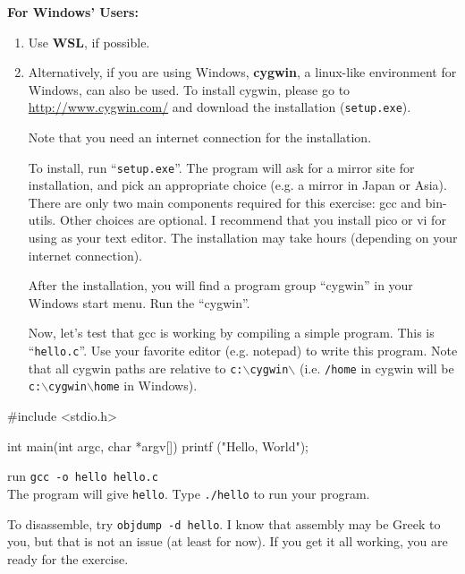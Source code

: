 \documentclass[a4paper, 10pt]{article}
\begin{document}
\noindent \textbf{For Windows' Users:}
\begin{enumerate}
	\item Use \textbf{WSL}, if possible.
	\item Alternatively, if you are using Windows, \textbf{cygwin}, a linux-like environment for Windows, can also be used.
				To install cygwin, please go to \url{http://www.cygwin.com/} and download the installation (\texttt{setup.exe}).

				\myspace

				Note that you need an internet connection for the installation.

				\myspace

				To install, run ``\texttt{setup.exe}''.
				The program will ask for a mirror site for installation, and pick an appropriate choice (e.g. a mirror in Japan or Asia).
				There are only two main components required for this exercise: gcc and bin-utils.
				Other choices are optional.
				I recommend that you install pico or vi for using as your text editor.
				The installation may take hours (depending on your internet connection).

				\myspace

				After the installation, you will find a program group ``cygwin'' in your Windows start menu.
				Run the ``cygwin''.

				\myspace

				Now, let's test that gcc is working by compiling a simple program.
				This is ``\texttt{hello.c}''.
				Use your favorite editor (e.g. notepad) to write this program. 
				Note that all cygwin paths are relative to \texttt{c:\( \backslash \)cygwin\( \backslash \)}
				(i.e. \texttt{/home} in cygwin will be \texttt{c:\( \backslash \)cygwin\( \backslash \)home} in Windows).
\end{enumerate}

\begin{codingbox}[language=C]
#include <stdio.h>

int main(int argc, char *argv[]) {
  printf ("Hello, World\n");
}
\end{codingbox}

\noindent run \texttt{gcc -o hello hello.c} \\
The program will give \texttt{hello}. Type \texttt{./hello} to run your program.

\myspace

\noindent To disassemble, try \texttt{objdump -d hello}.
I know that assembly may be Greek to you, but that is not an issue (at least for now).
If you get it all working, you are ready for the exercise.
\end{document}
